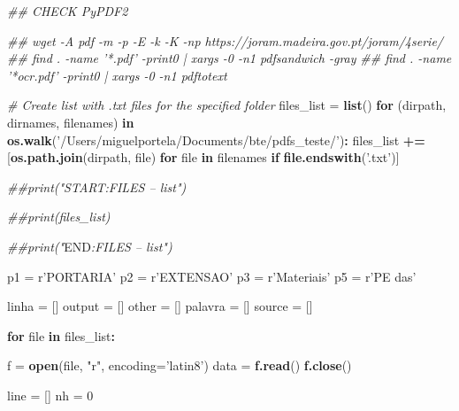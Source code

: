\documentclass[
  12pt,
]{article}
\newenvironment{Shaded}{\begin{snugshade}}{\end{snugshade}}
\newcommand{\CommentTok}[1]{\textcolor[rgb]{0.56,0.35,0.01}{\textit{#1}}}
\newcommand{\ControlFlowTok}[1]{\textcolor[rgb]{0.13,0.29,0.53}{\textbf{#1}}}
\newcommand{\DataTypeTok}[1]{\textcolor[rgb]{0.13,0.29,0.53}{#1}}
\newcommand{\DecValTok}[1]{\textcolor[rgb]{0.00,0.00,0.81}{#1}}
\newcommand{\ErrorTok}[1]{\textcolor[rgb]{0.64,0.00,0.00}{\textbf{#1}}}
\newcommand{\KeywordTok}[1]{\textcolor[rgb]{0.13,0.29,0.53}{\textbf{#1}}}
\newcommand{\NormalTok}[1]{#1}
\newcommand{\OperatorTok}[1]{\textcolor[rgb]{0.81,0.36,0.00}{\textbf{#1}}}
\newcommand{\RegionMarkerTok}[1]{#1}
\newcommand{\StringTok}[1]{\textcolor[rgb]{0.31,0.60,0.02}{#1}}
\begin{document}
\begin{Shaded}
\begin{Highlighting}[]
\CommentTok{## CHECK PyPDF2}

\CommentTok{## wget -A pdf -m -p -E -k -K -np https://joram.madeira.gov.pt/joram/4serie/}
\CommentTok{## find . -name '*.pdf' -print0 | xargs -0 -n1 pdfsandwich -gray}
\CommentTok{## find . -name '*ocr.pdf' -print0 | xargs -0 -n1 pdftotext}

\CommentTok{# Create list with .txt files for the specified folder}
\NormalTok{files_list =}\StringTok{ }\KeywordTok{list}\NormalTok{()}
\ControlFlowTok{for}\NormalTok{ (dirpath, dirnames, filenames) }\ControlFlowTok{in} \KeywordTok{os.walk}\NormalTok{(}\StringTok{'/Users/miguelportela/Documents/bte/pdfs_teste/'}\NormalTok{)}\OperatorTok{:}
\StringTok{    }\NormalTok{files_list }\OperatorTok{+}\ErrorTok{=}\StringTok{ }\NormalTok{[}\KeywordTok{os.path.join}\NormalTok{(dirpath, file)}
                   \ControlFlowTok{for}\NormalTok{ file }\ControlFlowTok{in}\NormalTok{ filenames }\ControlFlowTok{if} \KeywordTok{file.endswith}\NormalTok{(}\StringTok{'.txt'}\NormalTok{)]}


\CommentTok{##print("START:FILES -- list")}

\CommentTok{##print(files_list)}

\CommentTok{##print("}\RegionMarkerTok{END}\CommentTok{:FILES -- list")}

\NormalTok{p1 =}\StringTok{ }\NormalTok{r}\StringTok{'PORTARIA'}
\NormalTok{p2 =}\StringTok{ }\NormalTok{r}\StringTok{'EXTENSAO'}
\NormalTok{p3 =}\StringTok{ }\NormalTok{r}\StringTok{'Materiais'}
\NormalTok{p5 =}\StringTok{ }\NormalTok{r}\StringTok{'PE das'}

\NormalTok{linha =}\StringTok{ }\NormalTok{[]}
\NormalTok{output =}\StringTok{ }\NormalTok{[]}
\NormalTok{other =}\StringTok{ }\NormalTok{[]}
\NormalTok{palavra =}\StringTok{ }\NormalTok{[]}
\NormalTok{source =}\StringTok{ }\NormalTok{[]}

\ControlFlowTok{for}\NormalTok{ file }\ControlFlowTok{in}\NormalTok{ files_list}\OperatorTok{:}

\StringTok{    }\NormalTok{f =}\StringTok{ }\KeywordTok{open}\NormalTok{(file, }\StringTok{"r"}\NormalTok{, }\DataTypeTok{encoding=}\StringTok{'latin8'}\NormalTok{)}
\NormalTok{    data =}\StringTok{ }\KeywordTok{f.read}\NormalTok{()}
    \KeywordTok{f.close}\NormalTok{()}

\NormalTok{    line =}\StringTok{ }\NormalTok{[]}
\NormalTok{    nh =}\StringTok{ }\DecValTok{0}


\end{Highlighting}
\end{Shaded}
\end{document}
